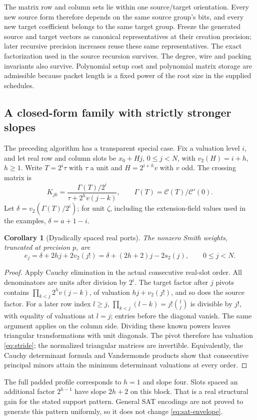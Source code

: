 \documentclass[11pt,letterpaper]{article}
\newtheorem{corollary}[theorem]{Corollary}
\theoremstyle{definition}\newtheorem{definition}[theorem]{Definition}
\theoremstyle{remark}\newtheorem{remark}[theorem]{Remark}
\newcommand{\vv}{v_2}
\newcommand{\pop}{s_2}
\begin{document}
The matrix row and column sets lie within one source/target orientation.
Every new source form therefore depends on the same source group's bits,
and every new target coefficient belongs to the same target group.
Freeze the generated source and target vectors as canonical representatives
at their creation precision; later recursive precision increases reuse
these same representatives. The exact factorization used in the source
recursion survives. The degree,
wire and packing invariants also survive. Polynomial setup cost and
polynomial matrix storage are admissible because packet length is a
fixed power of the root size in the supplied schedules.

\subsection{A closed-form family with strictly stronger slopes}
The preceding algorithm has a transparent special case. Fix a valuation
level $i$, and let real row and column slots be
$x_0+Hj$, $0\le j<N$, with $\vv(H)=i+h$, $h\ge1$.
Write $T=2^i\tau$ with $\tau$ a unit and $H=2^{i+h}v$ with $v$ odd.
The crossing matrix is
\[
 K_{jk}=\frac{\Gamma(T)/2^i}{\tau+2^hv(j-k)},
 \qquad \Gamma(T)=\mathcal C(T)/\mathcal C'(0).
\]
Let $\delta=\vv(\Gamma(T)/2^i)$; for unit $\zeta$, including the
extension-field values used in the examples, $\delta=a+1-i$.

\begin{corollary}[Dyadically spaced real ports]\label{cor:stride}
The nonzero Smith weights, truncated at precision $p$, are
\begin{equation}\label{eq:stride}
 e_j=\delta+2hj+2\vv(j!)
     =\delta+(2h+2)j-2\pop(j),\qquad 0\le j<N.
\end{equation}
\end{corollary}
\begin{proof}
Apply Cauchy elimination in the actual consecutive real-slot order.
All denominators are units after division by $2^i$.
The target factor after $j$ pivots contains
$\prod_{k<j}2^hv(j-k)$, of valuation $hj+\vv(j!)$,
and so does the source factor. For a later row index $l\ge j$,
$\prod_{k<j}(l-k)=j!\binom{l}{j}$ is divisible by $j!$, with equality
of valuations at $l=j$; entries before the diagonal vanish. The same
argument applies on the column side. Dividing these known powers leaves
triangular transformations with unit diagonals. The pivot therefore
has valuation \eqref{eq:stride}; the normalized triangular matrices
are invertible. Equivalently, the Cauchy determinant formula and
Vandermonde products show that consecutive principal minors attain
the minimum determinant valuations at every order.
\end{proof}
The full padded profile corresponds to $h=1$ and slope four. Slots
spaced an additional factor $2^{h-1}$ have slope $2h+2$ on this block.
That is a real structural gain for the stated support pattern. General
SAT encodings are not proved to generate this pattern uniformly, so it
does not change \eqref{eq:sat-envelope}.
\end{document}
